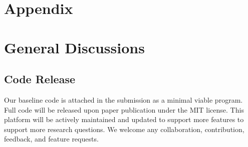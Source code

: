 \appendix
\section*{Appendix}


\section{General Discussions}
\subsection{Code Release}
Our baseline code is attached in the submission as a minimal viable program. Full code will be released upon paper publication under the MIT license. 
This platform will be actively maintained and updated to support more features to support more research questions. We welcome any collaboration, contribution, feedback, and feature requests.


